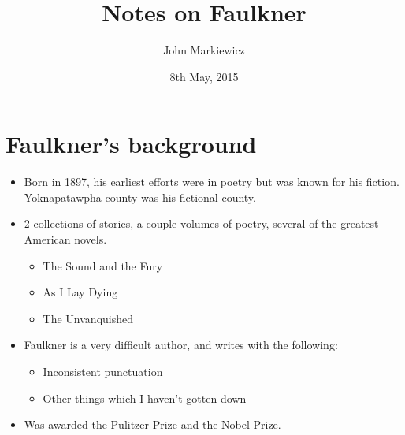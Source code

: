 \documentclass[11pt]{article}
\begin{document}
\title{Notes on Faulkner}
\author{John Markiewicz}
\date{8th May, 2015}
\maketitle
\section{Faulkner's background}
\begin{itemize}
	\item Born in 1897, his earliest efforts were in poetry but was known for his
		fiction.  Yoknapatawpha county was his fictional county.
	\item 2 collections of stories, a couple volumes of poetry, several of the
		greatest American novels.
		\begin{itemize}
			\item The Sound and the Fury
			\item As I Lay Dying
			\item The Unvanquished
		\end{itemize}
	\item Faulkner is a very difficult author, and writes with the following:
		\begin{itemize}
			\item Inconsistent punctuation
			\item Other things which I haven't gotten down
		\end{itemize}
	\item Was awarded the Pulitzer Prize and the Nobel Prize.
\end{itemize}
\end{document}
